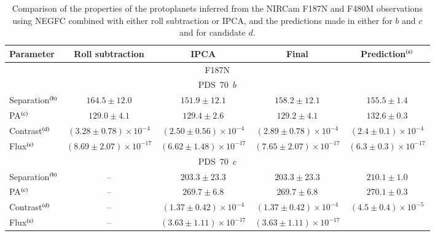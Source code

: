 \documentclass[longauth]{aa}
\begin{document}
\begin{appendix}
\begin{table}
\begin{center}
\caption{Comparison of the properties of the protoplanets inferred from the NIRCam F187N and F480M observations using NEGFC combined with either roll subtraction or IPCA, and the predictions made in either \citet{Wang2021} for $b$ and $c$ and  for candidate $d$.} 
\label{tab:comparison_NEGFC}
\begin{tabular}{lcccc}
\hline
\hline
Parameter & Roll subtraction & IPCA & Final & Prediction$^{\rm (a)}$\\
\hline
\multicolumn{5}{c}{F187N} \\
\hline
\multicolumn{5}{c}{PDS~70~$b$}\\
\hline
Separation$^{\rm (b)}$ & $164.5 \pm 12.0$ & $151.9 \pm 12.1$ & $158.2 \pm 12.1$ & $155.5 \pm 1.4$ %
\\
PA$^{\rm (c)}$ & $129.0 \pm 4.1$ & $129.4 \pm 2.6$ & $129.2 \pm 4.1$ & $132.6 \pm 0.3$ %
\\
Contrast$^{\rm (d)}$ & $(3.28 \pm 0.78) \times 10^{-4}$ & $(2.50 \pm 0.56) \times 10^{-4}$ & $(2.89 \pm 0.78) \times 10^{-4}$ & $(2.4 \pm 0.1) \times 10^{-4}$ %
\\
Flux$^{\rm (e)}$ & $(8.69 \pm 2.07) \times 10^{-17}$ & $(6.62  \pm 1.48) \times 10^{-17}$ & $(7.65  \pm 2.07) \times 10^{-17}$ & $(6.3  \pm 0.3) \times 10^{-17}$ %
\\
\hline
\multicolumn{5}{c}{PDS~70~$c$}\\
\hline
Separation$^{\rm (b)}$ & -- & $203.3 \pm 23.3$ & $203.3 \pm 23.3$ & $210.1 \pm 1.0$ %
\\
PA$^{\rm (c)}$ & -- & $269.7 \pm 6.8$ & $269.7 \pm 6.8$ & $270.1 \pm 0.3$%
\\  %
Contrast$^{\rm (d)}$ & -- %
& $(1.37 \pm 0.42) \times 10^{-4}$ & 
$(1.37 \pm 0.42) \times 10^{-4}$
& $(4.5 \pm 0.4) \times 10^{-5}$ %
\\
Flux$^{\rm (e)}$ & -- %
& $(3.63 \pm 1.11) \times 10^{-17}$ & 
$(3.63 \pm 1.11) \times 10^{-17}$

\end{tabular}
\end{center}
\end{table}
\end{appendix}
\end{document}
